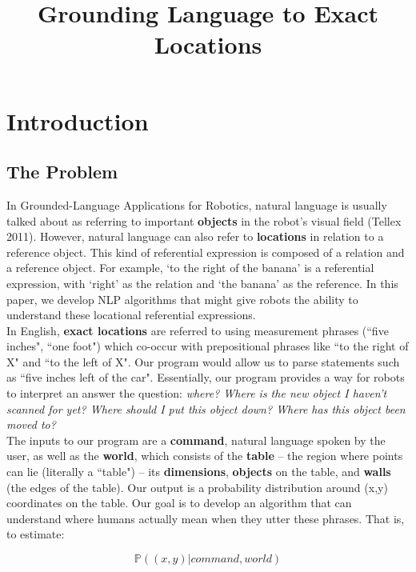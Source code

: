 \documentclass[12pt,letterpaper]{article}
\title{Grounding Language to Exact Locations}
\newcommand\tab[1][1cm]{\hspace*{#1}}
\newcommand\prob{\mathbb{P}}
\begin{document}
\maketitle
\section{Introduction}

\subsection{The Problem}

\tab In Grounded-Language Applications for Robotics, natural language is usually talked about as referring to important \textbf{objects} in the robot's visual field (Tellex 2011). However, natural language can also refer to \textbf{locations} in relation to a reference object. This kind of referential expression is composed of a relation and a reference object. For example, `to the right of the banana' is a referential expression, with `right' as the relation and `the banana' as the reference. In this paper, we develop NLP algorithms that might give robots the ability to understand these locational referential expressions.\\
\tab In English, \textbf{exact locations} are referred to using measurement phrases (``five inches", ``one foot") which co-occur with prepositional phrases like ``to the right of X" and ``to the left of X". Our program would allow us to parse statements such as ``five inches left of the car". Essentially, our program provides a way for robots to interpret an answer the question: \textit{where? Where is the new object I haven't scanned for yet? Where should I put this object down? Where has this object been moved to?}\\
\tab The inputs to our program are a \textbf{command}, natural language spoken by the user, as well as the \textbf{world}, which consists of the \textbf{table} \--- the region where points can lie (literally a ``table") \--- its \textbf{dimensions}, \textbf{objects} on the table, and \textbf{walls} (the edges of the table). Our output is a probability distribution around (x,y) coordinates on the table. Our goal is to develop an algorithm that can understand where humans actually mean when they utter these phrases. That is, to estimate:

\[\prob((x,y) | command, world)\]
\end{document}

